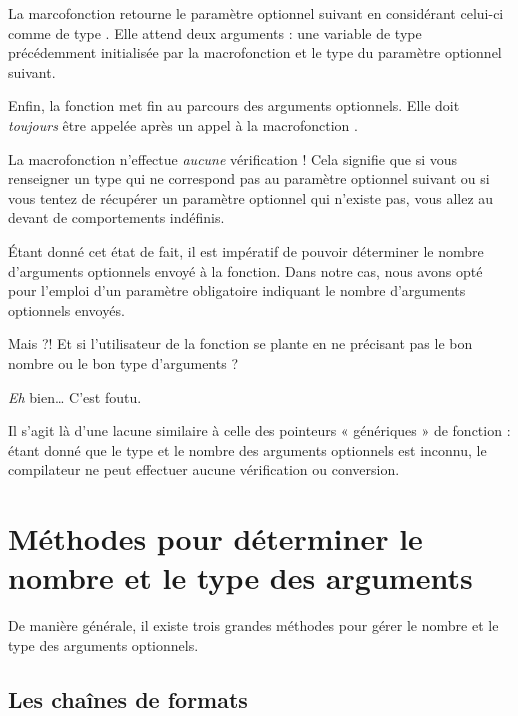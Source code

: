 La marcofonction  retourne le paramètre optionnel
suivant en considérant celui-ci comme de type . Elle attend
deux arguments : une variable de type  précédemment
initialisée par la macrofonction  et le type du
paramètre optionnel suivant.

Enfin, la fonction  met fin au parcours des arguments
optionnels. Elle doit \emph{toujours} être appelée après un appel à la
macrofonction .

\begin{erreurbox}
  La macrofonction 
n'effectue \emph{aucune} vérification ! Cela signifie que si vous
renseigner un type qui ne correspond pas au paramètre optionnel suivant
ou si vous tentez de récupérer un paramètre optionnel qui n'existe pas,
vous allez au devant de comportements indéfinis.
\end{erreurbox}


Étant donné cet état de fait, il est impératif de pouvoir déterminer le
nombre d'arguments optionnels envoyé à la fonction. Dans notre cas, nous
avons opté pour l'emploi d'un paramètre obligatoire indiquant le nombre
d'arguments optionnels envoyés.

\begin{questionbox}
  Mais ?! Et si l'utilisateur de la fonction se plante en ne précisant pas 
  le bon nombre ou le bon type d'arguments ?
\end{questionbox}


\emph{Eh} bien\ldots{} C'est foutu.

Il s'agit là d'une lacune similaire à celle des pointeurs « génériques »
de fonction : étant donné que le type et le nombre des arguments
optionnels est inconnu, le compilateur ne peut effectuer aucune
vérification ou conversion.

\section{Méthodes pour déterminer le nombre et le type des arguments}
\label{methodes-pour-determiner-le-nombre-et-le-type-des-arguments}

De manière générale, il existe trois grandes méthodes pour gérer le
nombre et le type des arguments optionnels.

\subsection{Les chaînes de formats}
\label{les-chaines-de-formats}

